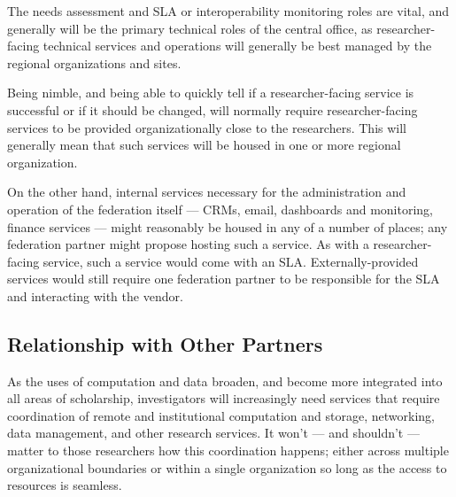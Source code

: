 \documentclass[11pt, letterpaper, twoside]{article}
\begin{document}
The needs assessment and SLA or interoperability monitoring roles are
vital, and generally will be the primary technical roles of the central
office, as researcher-facing technical services and operations will
generally be best managed by the regional organizations and sites.


Being nimble, and being able to quickly tell if a researcher-facing
service is successful or if it should be changed, will normally require
researcher-facing services to be provided organizationally close to the
researchers. This will generally mean that such services will be housed
in one or more regional organization.


On the other hand, internal services necessary for the administration
and operation of the federation itself --- CRMs, email, dashboards and
monitoring, finance services --- might reasonably be housed in any of a
number of places; any federation partner might propose hosting such a
service.  As with a researcher-facing service, such a service would come
with an SLA.  Externally-provided services would still require one
federation partner to be responsible for the SLA and interacting with
the vendor.

\subsection*{Relationship with Other Partners}
%

As the uses of computation and data broaden, and become more integrated
into all areas of scholarship, investigators will increasingly need
services that require coordination of remote and institutional
computation and storage, networking, data management, and other research
services. It won't --- and shouldn't --- matter to those researchers how
this coordination happens; either across multiple organizational
boundaries or within a single organization so long as the access to
resources is seamless.

\end{document}
